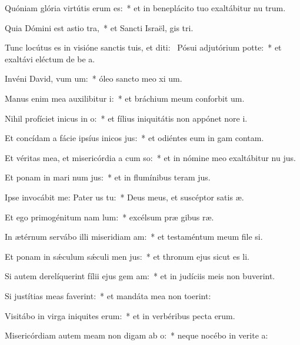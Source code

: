 \item Quóniam glória virtútis erum  es:~* et in beneplácito tuo exaltábitur nu trum.
\item Quia Dómini est astio tra,~* et Sancti Israël, gis tri.
\item Tunc locútus es in visióne sanctis tuis, et diti:~\pscross{} Pósui adjutórium  potte:~* et exaltávi eléctum de be a.
\item Invéni David, vum um:~* óleo sancto meo xi um.
\item Manus enim mea auxilibitur i:~* et bráchium meum conforbit um.
\item Nihil profíciet inicus in o:~* et fílius iniquitátis non appónet nore i.
\item Et concídam a fácie ipsíus inicos jus:~* et odiéntes eum in gam contam.
\item Et véritas mea, et misericórdia a cum so:~* et in nómine meo exaltábitur nu jus.
\item Et ponam in mari num jus:~* et in flumínibus teram jus.
\item Ipse invocábit me: Pater us  tu:~* Deus meus, et suscéptor satis æ.
\item Et ego primogénitum nam lum:~* excélsum præ gibus ræ.
\item In ætérnum servábo illi miseridiam am:~* et testaméntum meum file si.
\item Et ponam in sǽculum sǽculi men jus:~* et thronum ejus sicut es li.
\item Si autem derelíquerint fílii ejus gem am:~* et in judíciis meis non buverint.
\item Si justítias meas faverint:~* et mandáta mea non toerint:
\item Visitábo in virga iniquites erum:~* et in verbéribus pecta erum.
\item Misericórdiam autem meam non digam ab o:~* neque nocébo in verite a:

